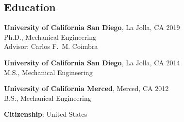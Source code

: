 \documentclass[10pt]{res}
\begin{document}
\address{\url{https://www.linkedin.com/in/dplarson/}}


\begin{resume}


\section{Education}
\vspace{0.1in}

\textbf{University of California San Diego}, La Jolla, CA \hfill 2019 \\
Ph.D., Mechanical Engineering \\
Advisor: Carlos F.~M. Coimbra \\

\vspace{-0.2in}

\textbf{University of California San Diego}, La Jolla, CA \hfill 2014 \\
M.S., Mechanical Engineering \\

\vspace{-0.2in}

\textbf{University of California Merced}, Merced, CA \hfill 2012 \\
B.S., Mechanical Engineering


\hspace{-0.55in} \textbf{Citizenship}: United States


%

\end{resume}
\end{document}

